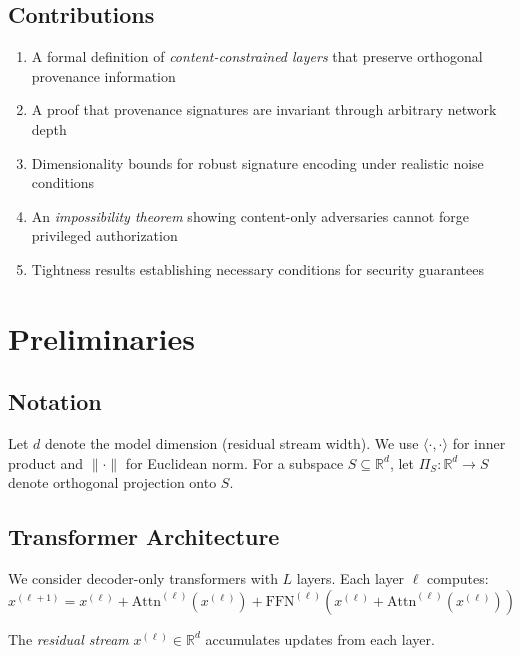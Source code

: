 \documentclass[11pt,a4paper]{article}
\theoremstyle{plain}
\theoremstyle{definition}
\theoremstyle{remark}
\newcommand{\R}{\mathbb{R}}
\newcommand{\ip}[2]{\langle #1, #2 \rangle}
\newcommand{\norm}[1]{\| #1 \|}
\newcommand{\proj}[1]{\Pi_{#1}}
\newcommand{\Attn}{\mathrm{Attn}}
\newcommand{\FFN}{\mathrm{FFN}}
\begin{document}
\subsection{Contributions}

\begin{enumerate}
    \item A formal definition of \emph{content-constrained layers} that preserve orthogonal provenance information
    \item A proof that provenance signatures are invariant through arbitrary network depth
    \item Dimensionality bounds for robust signature encoding under realistic noise conditions
    \item An \emph{impossibility theorem} showing content-only adversaries cannot forge privileged authorization
    \item Tightness results establishing necessary conditions for security guarantees
\end{enumerate}

\section{Preliminaries}

\subsection{Notation}

Let $d$ denote the model dimension (residual stream width). We use $\ip{\cdot}{\cdot}$ for inner product and $\norm{\cdot}$ for Euclidean norm. For a subspace $S \subseteq \R^d$, let $\proj{S}: \R^d \to S$ denote orthogonal projection onto $S$.

\subsection{Transformer Architecture}

We consider decoder-only transformers with $L$ layers. Each layer $\ell$ computes:
\begin{equation}
x^{(\ell+1)} = x^{(\ell)} + \Attn^{(\ell)}(x^{(\ell)}) + \FFN^{(\ell)}(x^{(\ell)} + \Attn^{(\ell)}(x^{(\ell)}))
\end{equation}

The \emph{residual stream} $x^{(\ell)} \in \R^d$ accumulates updates from each layer.
\end{document}
